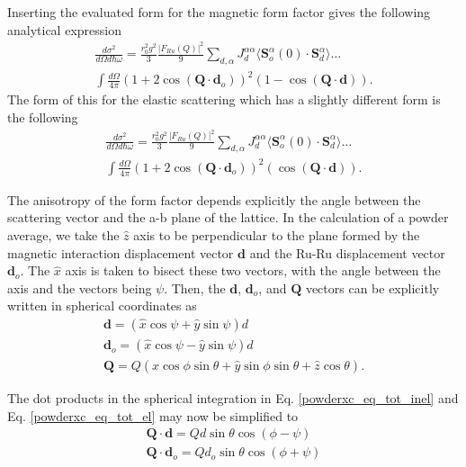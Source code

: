 \documentclass[%
 reprint,
superscriptaddress,
 amsmath,amssymb,
 aps,
 prb,
]{revtex4-2}
\begin{document}
Inserting the evaluated form for the magnetic form factor gives the following analytical expression
\begin{multline}
    \frac{d\sigma^2}{d\Omega d\hbar\omega} =\frac{r_0^2 g^2}{3}\frac{|F_{Ru}(Q)|^2}{9}\sum_{d,\alpha} J_d^{\alpha\alpha}\langle \textbf{S}_o^{\alpha}(0)\cdot \textbf{S}_d^{\alpha} \rangle \ldots \\
    \int \frac{d\Omega}{4\pi}(1+2\cos(\textbf{Q}  \cdot \textbf{d}_o))^2(1-\cos(\textbf{Q}\cdot\textbf{d})).
    \label{powderxc_eq_tot_inel}
\end{multline}
The form of this for the elastic scattering which has a slightly different form is the following
\begin{multline}
    \frac{d\sigma^2}{d\Omega d\hbar\omega} =\frac{r_0^2 g^2}{3}\frac{|F_{Ru}(Q)|^2}{9}\sum_{d,\alpha} J_d^{\alpha\alpha}\langle \textbf{S}_o^{\alpha}(0)\cdot \textbf{S}_d^{\alpha} \rangle \ldots \\
    \int \frac{d\Omega}{4\pi}(1+2\cos(\textbf{Q}  \cdot \textbf{d}_o))^2(\cos(\textbf{Q}\cdot\textbf{d})).
    \label{powderxc_eq_tot_el}
\end{multline}

The anisotropy of the form factor depends explicitly the angle between the scattering vector and the a-b plane of the lattice. In the calculation of a powder average, we take the $\hat{z}$ axis to be perpendicular to the plane formed by the magnetic interaction displacement vector $\textbf{d}$ and the Ru-Ru displacement vector $\textbf{d}_o$. The $\hat{x}$ axis is taken to bisect these two vectors, with the angle between the axis and the vectors being $\psi$. Then, the $\textbf{d}$, $\textbf{d}_o$, and $\textbf{Q}$ vectors can be explicitly written in spherical coordinates as
\begin{gather}
    \textbf{d}= (\hat{x} \cos{\psi} + \hat{y} \sin{\psi})d\\
    \textbf{d}_o = (\hat{x} \cos{\psi} - \hat{y} \sin{\psi})d \\
    \textbf{Q}= Q(\hat{x} \cos{\phi}\sin{\theta} + \hat{y}\sin{\phi}\sin{\theta}+\hat{z}\cos{\theta}).
    \label{coordinate_system_def}
\end{gather}

The dot products in the spherical integration in Eq. \ref{powderxc_eq_tot_inel} and Eq. \ref{powderxc_eq_tot_el} may now be simplified to
\begin{gather}
    \textbf{Q}\cdot \textbf{d} = Qd\sin{\theta}\cos{(\phi - \psi)} \\
    \textbf{Q}\cdot\textbf{d}_o = Qd_o \sin{\theta}\cos{(\phi+\psi)} 
    \label{eq:simplified_coords}
\end{gather}
\end{document}
